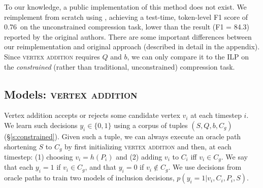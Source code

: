 \documentclass[11pt,a4paper]{article}
\newcommand{\ilptest}[0]{0.76~}
\begin{document}
To our knowledge, a public implementation of this method does not exist. We reimplement from scratch using \citet{gurobi}, achieving a test-time, token-level F1 score of \ilptest on the unconstrained compression task, lower than the result {\small (F1 = 84.3)} reported by the original authors. There are some important differences between our reimplementation and original approach (described in detail in the appendix). Since \textsc{vertex addition} requires $Q$ and $b$, we can only compare it to the ILP on the \textit{constrained} (rather than traditional, unconstrained) compression task.

\subsection{Models: \textsc{vertex addition}}\label{s:transition}

Vertex addition accepts or rejects some candidate vertex $v_i$ at each timestep $i$. 
We learn such decisions $y_i \in \{0,1\}$ using a corpus of tuples $(S,Q,b,C_g)$ (\S\ref{s:constrained}). Given such a tuple, we can always execute an oracle path shortening $S$ to $C_g$ by first initializing \textsc{vertex addition} and then, at each timestep: (1) choosing $v_i = h(P_i)$ and (2) adding $v_i$ to $C_i$ iff $v_i \in C_g$. We say that each $y_i=1$ if $v_i \in C_g$, and that $y_i=0$ if $v_i \notin C_g$. We use decisions from oracle paths to train two models of inclusion decisions, ${p(y_i  = 1 | v_i, C_i, P_i, S)}$.
\end{document}
